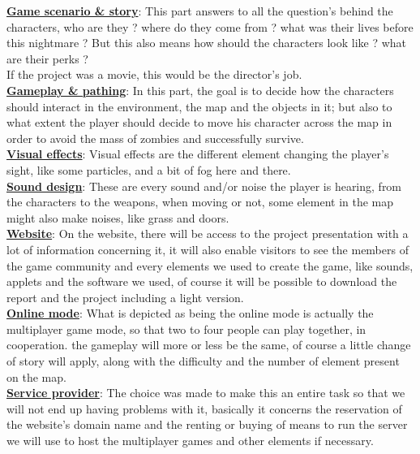 \documentclass[12pt]{article}
\begin{document}
\underline{\textbf{Game scenario \& story}}: This part answers to all the question's behind the characters, who are they ? where do they come from ? what was their lives before this nightmare ? But this also means how should the characters look like ? what are their perks ?\\
If the project was a movie, this would be the director's job.\\

\underline{\textbf{Gameplay \& pathing}}: In this part, the goal is to decide how the characters should interact in the environment, the map and the objects in it; but also to what extent the player should decide to move his character across the map in order to avoid the mass of zombies and successfully survive.\\

\underline{\textbf{Visual effects}}: Visual effects are the different element changing the player's sight, like some particles, and a bit of fog here and there.\\

\underline{\textbf{Sound design}}: These are every sound and/or noise the player is hearing, from the characters to the weapons, when moving or not, some element in the map might also make noises, like grass and doors.\\

\underline{\textbf{Website}}: On the website, there will be access to the project presentation with a lot of information concerning it, it will also enable visitors to see the members of the game community and every elements we used to create the game, like sounds, applets and the software we used, of course it will be possible to download the report and the project including a light version.  \\

\underline{\textbf{Online mode}}: What is depicted as being the online mode is actually the multiplayer game mode, so that two to four people can play together, in cooperation. the gameplay will more or less be the same, of course a little change of story will apply, along with the difficulty and the number of element present on the map. \\

\underline{\textbf{Service provider}}: The choice was made to make this an entire task so that we will not end up having problems with it, basically it concerns the reservation of the website's domain name and the renting or buying of means to run the server we will use to host the multiplayer games and other elements if necessary.\\
\end{document}
